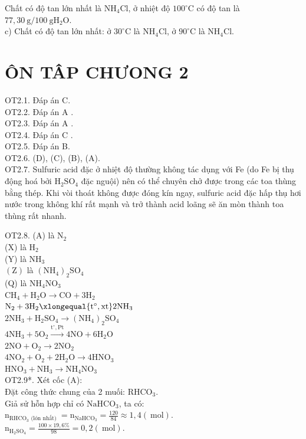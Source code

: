\documentclass[10pt]{article}
\begin{document}
Chất có độ tan lớn nhất là $\mathrm{NH}_{4} \mathrm{Cl}$, ở nhiệt độ $100^{\circ} \mathrm{C}$ có độ tan là $77,30 \mathrm{~g} / 100 \mathrm{~g} \mathrm{H}_{2} \mathrm{O}$.\\
c) Chất có độ tan lớn nhất: ở $30^{\circ} \mathrm{C}$ là $\mathrm{NH}_{4} \mathrm{Cl}$, ở $90^{\circ} \mathrm{C}$ là $\mathrm{NH}_{4} \mathrm{Cl}$.

\section*{ÔN TÂP CHƯONG 2}
OT2.1. Đáp án C.\\
OT2.2. Đáp án A .\\
OT2.3. Đáp án A .\\
OT2.4. Đáp án C .\\
OT2.5. Đáp án B.\\
OT2.6. (D), (C), (B), (A).\\
OT2.7. Sulfuric acid đặc ở nhiệt độ thường không tác dụng với Fe (do Fe bị thụ động hoá bởi $\mathrm{H}_{2} \mathrm{SO}_{4}$ đặc nguội) nên có thể chuyên chở được trong các toa thùng bằng thép. Khi vòi thoát không được đóng kín ngay, sulfuric acid đặc hấp thụ hơi nước trong không khí rất mạnh và trở thành acid loãng sẽ ăn mòn thành toa thùng rất nhanh.

OT2.8. (A) là $\mathrm{N}_{2}$\\
(X) là $\mathrm{H}_{2}$\\
(Y) là $\mathrm{NH}_{3}$\\
$(\mathrm{Z})$ là $\left(\mathrm{NH}_{4}\right)_{2} \mathrm{SO}_{4}$\\
(Q) là $\mathrm{NH}_{4} \mathrm{NO}_{3}$\\
$\mathrm{CH}_{4}+\mathrm{H}_{2} \mathrm{O} \rightarrow \mathrm{CO}+3 \mathrm{H}_{2}$\\
$\mathrm{N}_{2}+3 \mathrm{H}_{2} \xlongequal{\mathrm{t}^{\circ}, \mathrm{xt}} 2 \mathrm{NH}_{3}$\\
$2 \mathrm{NH}_{3}+\mathrm{H}_{2} \mathrm{SO}_{4} \rightarrow\left(\mathrm{NH}_{4}\right)_{2} \mathrm{SO}_{4}$\\
$4 \mathrm{NH}_{3}+5 \mathrm{O}_{2} \xrightarrow{\mathrm{t}^{\circ}, \mathrm{Pt}} 4 \mathrm{NO}+6 \mathrm{H}_{2} \mathrm{O}$\\
$2 \mathrm{NO}+\mathrm{O}_{2} \rightarrow 2 \mathrm{NO}_{2}$\\
$4 \mathrm{NO}_{2}+\mathrm{O}_{2}+2 \mathrm{H}_{2} \mathrm{O} \rightarrow 4 \mathrm{HNO}_{3}$\\
$\mathrm{HNO}_{3}+\mathrm{NH}_{3} \rightarrow \mathrm{NH}_{4} \mathrm{NO}_{3}$\\
OT2.9*. Xét cốc (A):\\
Đặt công thức chung của 2 muối: $\mathrm{RHCO}_{3}$.\\
Giả sử hỗn hợp chỉ có $\mathrm{NaHCO}_{3}$, ta có:\\
$\mathrm{n}_{\mathrm{RHCO}_{3} \text { (lón nhất) }}=\mathrm{n}_{\mathrm{NaHCO}_{3}}=\frac{120}{84} \approx 1,4(\mathrm{~mol})$.\\
$\mathrm{n}_{\mathrm{H}_{2} \mathrm{SO}_{4}}=\frac{100 \times 19,6 \%}{98}=0,2(\mathrm{~mol})$.
\end{document}
